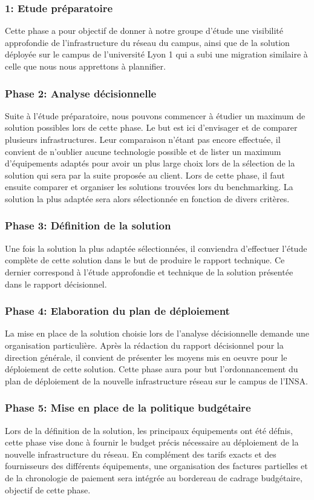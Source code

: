 \subsubsection{1: Etude préparatoire} Cette phase a pour objectif de donner à notre groupe d'étude une visibilité approfondie de l'infrastructure du réseau du campus, ainsi que de la solution déployée sur le campus de l'université Lyon 1 qui a subi une migration similaire à celle que nous nous apprettons à plannifier. 

\subsubsection{Phase 2: Analyse décisionnelle} Suite à l'étude préparatoire, nous pouvons commencer à étudier un maximum de solution possibles lors de cette phase. Le but est ici d'envisager et de comparer plusieurs infrastructures. Leur comparaison n'étant pas encore effectuée, il convient de n'oublier aucune technologie possible et de lister un maximum d'équipements adaptés pour avoir un plus large choix lors de la sélection de la solution qui sera par la suite proposée au client. Lors de cette phase, il faut ensuite comparer et organiser les solutions trouvées lors du benchmarking. La solution la plus adaptée sera alors sélectionnée en fonction de divers critères.

\subsubsection{Phase 3: Définition de la solution} Une fois la solution la plus adaptée sélectionnées, il conviendra d'effectuer l'étude complète de cette solution dans le but de produire le rapport technique. Ce dernier correspond à l'étude approfondie et technique de la solution présentée dans le rapport décisionnel.    

\subsubsection{Phase 4: Elaboration du plan de déploiement} La mise en place de la solution choisie lors de l'analyse décisionnelle demande une organisation particulière. Après la rédaction du rapport décisionnel pour la direction générale, il convient de présenter les moyens mis en oeuvre pour le déploiement de cette solution. Cette phase aura pour but l'ordonnancement du plan de déploiement de la nouvelle infrastructure réseau sur le campus de l'INSA. 

\subsubsection{Phase 5: Mise en place de la politique budgétaire} Lors de la définition de la solution, les principaux équipements ont été défnis, cette phase vise donc à fournir le budget précis nécessaire au déploiement de la nouvelle infrastructure du réseau. En complément des tarifs exacts et des fournisseurs des différents équipements, une organisation des factures partielles et de la chronologie de paiement sera intégrée au bordereau de cadrage budgétaire, objectif de cette phase.
